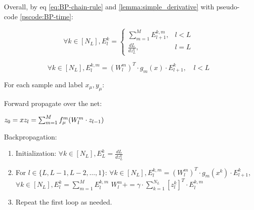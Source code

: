 Overall, by eq \ref{eq:BP-chain-rule} and \ref{lemma:simple_derivative} with pseudo-code \ref{pscode:BP-time}:

\begin{equation}
    \forall k \in [N_L], E_l^k = \begin{cases} \sum_{m=1}^M E_{l+1}^{k,m}, & l < L \\ \frac{dL}{dz_L^k}, & l = L \end{cases}
\end{equation}

\begin{equation}
    \forall k \in [N_L], E_l^{k,m} = (W_l^m)^T \cdot g_m(x) \cdot E_{l+1}^k, \quad l < L
\end{equation}


\begin{mdframed}[backgroundcolor=green_background, linecolor=black, linewidth=2pt, frametitle=\textbf{Pseudo-code}]

For each sample and label \(x_\mu, y_\mu\):

Forward propagate over the net:

\(z_0 = x \\ z_l = \sum_{m=1}^M f_\mu^m(W_l^m \cdot z_{l-1})\)

Backpropagation:

\begin{enumerate}
    \item Initialization:
    \(\forall k \in [N_L], E_L^k = \frac{dL}{dz_L^k}\)

    \item For \(l \in \{L, L-1, L-2, \ldots, 1\}\):
    \(\forall k \in [N_L], E_l^{k,m} = (W_l^m)^T \cdot g_m(x^k) \cdot E_{l+1}^k\), \(\forall k \in [N_L], E_l^k = \sum_{m=1}^M E_l^{k,m}\)
    \(W_l^m += \gamma \cdot \sum_{k=1}^{N_L} [z_l^k]^T \cdot E_l^{k,m}\)

    \item Repeat the first loop as needed.
    
\end{enumerate}

\end{mdframed}

